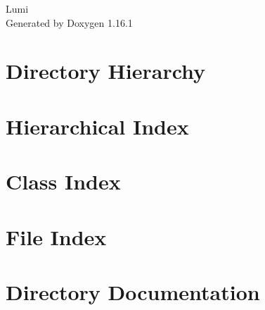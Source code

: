 \documentclass[twoside]{book}
\newcommand{\+}{\discretionary{\mbox{\scriptsize$\hookleftarrow$}}{}{}}
\newcommand{\clearemptydoublepage}{%
    \newpage{\pagestyle{empty}\cleardoublepage}%
  }
\begin{document}
  \raggedbottom
    \hypersetup{pageanchor=false,
                bookmarksnumbered=true,
                pdfencoding=unicode
               }
  \begin{titlepage}
  \vspace*{7cm}
  \begin{center}%
  {\Large Lumi}\\
  \vspace*{1cm}
  {\large Generated by Doxygen 1.16.1}\\
  \end{center}
  \end{titlepage}
  \clearemptydoublepage
  \tableofcontents
  \clearemptydoublepage
  \hypersetup{pageanchor=true}
\chapter{Directory Hierarchy}

\chapter{Hierarchical Index}

\chapter{Class Index}

\chapter{File Index}

\chapter{Directory Documentation}





\end{document}
